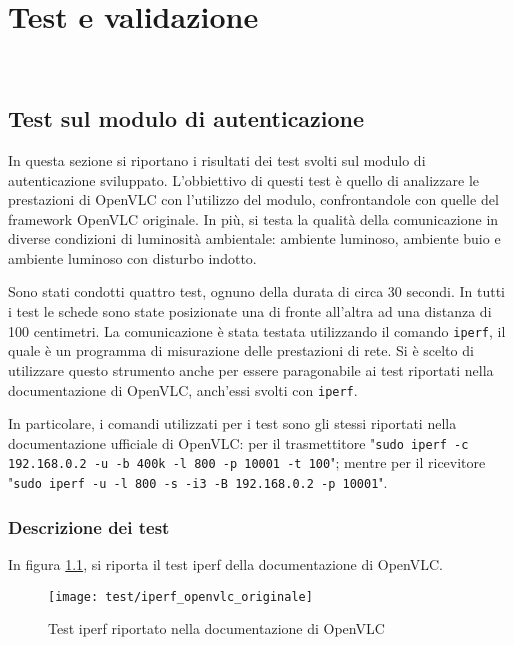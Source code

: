 \chapter{Test e validazione}
\label{cap:test}

\\

\section{Test sul modulo di autenticazione}
In questa sezione si riportano i risultati dei test svolti sul modulo di autenticazione sviluppato. L'obbiettivo di questi test è quello di analizzare le prestazioni di OpenVLC con l'utilizzo del modulo, confrontandole con quelle del framework OpenVLC originale. In più, si testa la qualità della comunicazione in diverse condizioni di luminosità ambientale: ambiente luminoso, ambiente buio e ambiente luminoso con disturbo indotto.

Sono stati condotti quattro test, ognuno della durata di circa 30 secondi. In tutti i test le schede sono state posizionate una di fronte all'altra ad una distanza di 100 centimetri. La comunicazione è stata testata utilizzando il comando \texttt{iperf}, il quale è un programma di misurazione delle prestazioni di rete. Si è scelto di utilizzare questo strumento anche per essere paragonabile ai test riportati nella documentazione di OpenVLC, anch'essi svolti con \texttt{iperf}.

In particolare, i comandi utilizzati per i test sono gli stessi riportati nella documentazione ufficiale di OpenVLC: per il trasmettitore "\texttt{sudo iperf -c 192.168.0.2 -u -b 400k -l 800 -p 10001 -t 100}"; mentre per il ricevitore "\texttt{sudo iperf -u -l 800 -s -i3 -B 192.168.0.2 -p 10001}".

\subsection{Descrizione dei test}

In figura \ref{fig:iperf_openvlc_originale}, si riporta il test iperf della documentazione di OpenVLC.
\begin{figure}[H] 
    \centering 
    \texttt{[image: test/iperf\_openvlc\_originale]} 
    \caption{Test iperf riportato nella documentazione di OpenVLC}
    \label{fig:iperf_openvlc_originale}
\end{figure}

